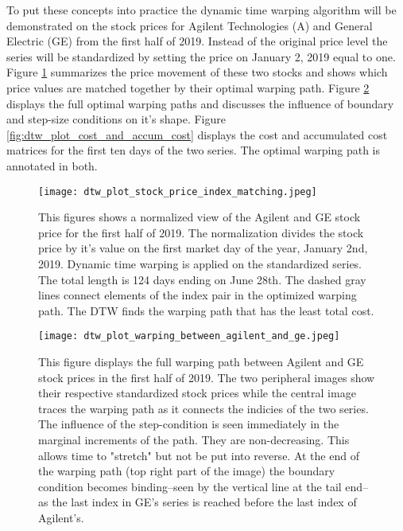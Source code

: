 \documentclass[12pt]{article}
\begin{document}
To put these concepts into practice the dynamic time warping algorithm will be demonstrated on the stock prices for Agilent Technologies (A) and General Electric (GE) from the first half of 2019. Instead of the original price level the series will be standardized by setting the price on January 2, 2019 equal to one. Figure \ref{fig:dtw_plot_stock_price_index_matching} summarizes the price movement of these two stocks and shows which price values are matched together by their optimal warping path. Figure \ref{fig:dtw_plot_warping_between_agilent_and_ge} displays the full optimal warping paths and discusses the influence of boundary and step-size conditions on it's shape. Figure \ref{fig:dtw_plot_cost_and_accum_cost} displays the cost and accumulated cost matrices for the first ten days of the two series. The optimal warping path is annotated in both.

\begin{figure}
    \centering
    \texttt{[image: dtw\_plot\_stock\_price\_index\_matching.jpeg]}
    \caption{This figures shows a normalized view of the Agilent and GE stock price for the first half of 2019. The normalization divides the stock price by it's value on the first market day of the year, January 2nd, 2019. Dynamic time warping is applied on the standardized series. The total length is 124 days ending on June 28th. The dashed gray lines connect elements of the index pair in the optimized warping path. The DTW finds the warping path that has the least total cost.}
    \label{fig:dtw_plot_stock_price_index_matching}
\end{figure}

\begin{figure}
    \centering
    \texttt{[image: dtw\_plot\_warping\_between\_agilent\_and\_ge.jpeg]}
    \caption{This figure displays the full warping path between Agilent and GE stock prices in the first half of 2019. The two peripheral images show their respective standardized stock prices while the central image traces the warping path as it connects the indicies of the two series. The influence of the step-condition is seen immediately in the marginal increments of the path. They are non-decreasing. This allows time to "stretch" but not be put into reverse. At the end of the warping path (top right part of the image) the boundary condition becomes binding--seen by the vertical line at the tail end--as the last index in GE's series is reached before the last index of Agilent's.}
    \label{fig:dtw_plot_warping_between_agilent_and_ge}
\end{figure}
\end{document}
